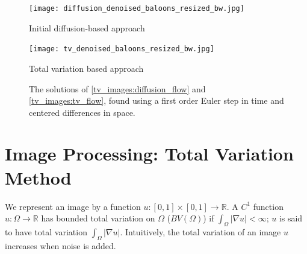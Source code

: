\begin{figure}
\begin{minipage}[b]{.47\linewidth}
\centering
\texttt{[image: diffusion\_denoised\_baloons\_resized\_bw.jpg]}
\caption*{Initial diffusion-based approach}
\end{minipage}
\hspace{0.5cm}
\begin{minipage}[b]{0.47\linewidth}
\centering
\texttt{[image: tv\_denoised\_baloons\_resized\_bw.jpg]}
\caption*{Total variation based approach}
\end{minipage}
\caption{The solutions of \eqref{tv_images:diffusion_flow} and \eqref{tv_images:tv_flow}, found using a first order Euler step in time and centered differences in space.}
\label{fig:noise_compare_attempts}
\end{figure}


\section*{Image Processing: Total Variation Method}
We represent an image by a function $u:[0,1]\times[0,1] \to \mathbb{R}$. 
A $C^1$ function $u:\Omega \to \mathbb{R}$ has bounded total variation on $\Omega$ ($BV(\Omega)$) if $\int_{\Omega} |\nabla u| < \infty$; $u$ is said to have total variation $\int_{\Omega} |\nabla u|$.  Intuitively, the total variation of an image $u$ increases when noise is added. 

